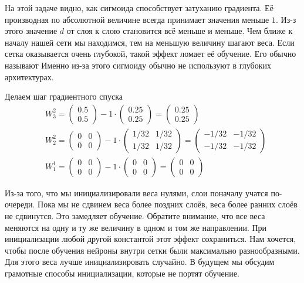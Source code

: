 \begin{sol}
На этой задаче видно, как сигмоида способствует затуханию градиента. Её производная по абсолютной величине всегда принимает значения меньше $1$. Из-з этого значение $d$ от слоя к слою становится всё меньше и меньше. Чем ближе к началу нашей сети мы находимся, тем на меньшую величину шагают веса. Если сетка оказывается очень глубокой, такой эффект ломает её обучение. Его обычно называют  Именно из-за этого сигмоиду обычно не используют в глубоких архитектурах. 

Делаем шаг градиентного спуска
\begin{equation*} 
	\begin{aligned}
        & W_3^2 = \begin{pmatrix} 0.5 \\ 0.5 \end{pmatrix} - 1 \cdot \begin{pmatrix} 0.25 \\ 0.25 \end{pmatrix} = \begin{pmatrix} 0.25 \\ 0.25 \end{pmatrix} \\
        & W_2^2 = \begin{pmatrix} 0 & 0 \\ 0 & 0 \end{pmatrix} - 1 \cdot \begin{pmatrix}1/32 & 1/32 \\ 1/32 & 1/32 \end{pmatrix} = \begin{pmatrix} -1/32 & -1/32 \\ -1/32 & -1/32 \end{pmatrix} \\
        & W_1^1 = \begin{pmatrix} 0 & 0 \\ 0 & 0 \end{pmatrix} - 1 \cdot \begin{pmatrix} 0 & 0 \\ 0 & 0 \end{pmatrix} = \begin{pmatrix} 0 & 0 \\ 0 & 0 \end{pmatrix}
	\end{aligned}
\end{equation*}

Из-за того, что мы инициализировали веса нулями, слои поначалу учатся по-очереди. Пока мы не сдвинем веса более поздних слоёв, веса более ранних слоёв не сдвинутся. Это замедляет обучение. Обратите внимание, что все веса меняются на одну и ту же величину в одном и том же направлении. При инициализации любой другой константой этот эффект сохраниться. Нам хочется, чтобы после обучения нейроны внутри сетки были максимально разнообразными. Для этого веса лучше инициализировать случайно. В будущем мы обсудим грамотные способы инициализации, которые не портят обучение. 
\end{sol} 


